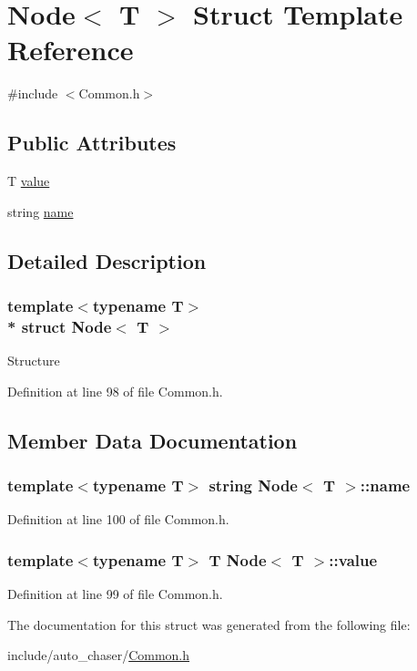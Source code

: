 \hypertarget{struct_node}{}\section{Node$<$ T $>$ Struct Template Reference}
\label{struct_node}


{\ttfamily \#include $<$Common.\+h$>$}

\subsection*{Public Attributes}
\begin{DoxyCompactItemize}
\item 
T \hyperlink{struct_node_a01b9071c0de774c720b64583262d1559}{value}
\item 
string \hyperlink{struct_node_a795bdc93cbf63ccddcdf2168d858492c}{name}
\end{DoxyCompactItemize}


\subsection{Detailed Description}
\subsubsection*{template$<$typename T$>$\\*
struct Node$<$ T $>$}

Structure 

Definition at line 98 of file Common.\+h.



\subsection{Member Data Documentation}
\subsubsection[{\texorpdfstring{name}{name}}]{\setlength{\rightskip}{0pt plus 5cm}template$<$typename T$>$ string {\bf Node}$<$ T $>$\+::name}\hypertarget{struct_node_a795bdc93cbf63ccddcdf2168d858492c}{}\label{struct_node_a795bdc93cbf63ccddcdf2168d858492c}


Definition at line 100 of file Common.\+h.

\subsubsection[{\texorpdfstring{value}{value}}]{\setlength{\rightskip}{0pt plus 5cm}template$<$typename T$>$ T {\bf Node}$<$ T $>$\+::value}\hypertarget{struct_node_a01b9071c0de774c720b64583262d1559}{}\label{struct_node_a01b9071c0de774c720b64583262d1559}


Definition at line 99 of file Common.\+h.



The documentation for this struct was generated from the following file\+:\begin{DoxyCompactItemize}
\item 
include/auto\+\_\+chaser/\hyperlink{_common_8h}{Common.\+h}\end{DoxyCompactItemize}
